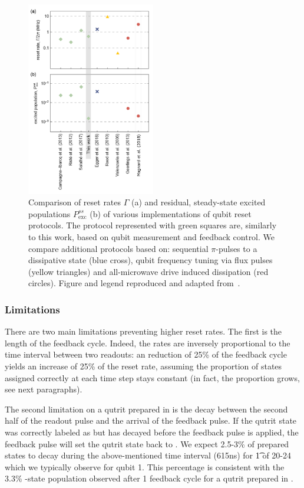 \begin{figure}[ht]
    \centering
    \includegraphics[width=0.5\textwidth]{appendices/qutrit_readout/figs/table_reset_rates.png}
    \caption{Comparison of reset rates $\Gamma$ (a) and residual, steady-state excited populations $P_\textrm{exc}^{ss}$ (b) of various implementations  of  qubit  reset  protocols. The protocol represented with green squares are, similarly to this work, based on qubit measurement and feedback control. We compare additional protocols based on: sequential $\pi$-pulses  to  a  dissipative  state (blue cross), qubit frequency tuning via flux pulses (yellow triangles) and all-microwave drive induced dissipation (red circles). Figure and legend reproduced and adapted from~\cite[Supplementary Material]{Magnard2018FastQubit}.}
    \label{fig:qutrit_readout_reset_rate_comparison}
\end{figure}

\subsubsection{Limitations}
There are two main limitations preventing higher reset rates. The first is the length of the feedback cycle. Indeed, the rates are inversely proportional to the time interval between two readouts: an reduction of 25\% of the feedback cycle yields an increase of 25\% of the reset rate, assuming the proportion of states assigned correctly at each time step stays constant (in fact, the proportion grows, see next paragraphs).

The second limitation on a qutrit prepared in \e{} is the decay between the second half of the readout pulse and the arrival of the feedback pulse. If the qutrit state was correctly labeled as \e{} but has decayed before the feedback pulse is applied, the feedback pulse will set the qutrit state back to \e{}. We expect 2.5-3\% of prepared states to decay during the above-mentioned time interval (615\unit{ns}) for \t{1} of 20-24\us{} which we typically observe for qubit 1. This percentage is consistent with the 3.3\% \e-state population observed after 1 feedback cycle for a qutrit prepared in \e. 

